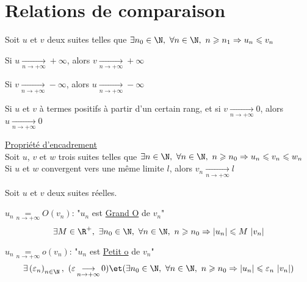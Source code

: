 \documentclass[12pt,twoside,a4paper]{article}
\begin{document}
	\section{Relations de comparaison}
		\begin{prop}
			Soit $u$ et $v$ deux suites telles que $\exists n_0\in\N,\ \forall n\in\N,\ n\geqslant n_1\Rightarrow u_n\leqslant v_n$
			\begin{liste}
				\item Si $u\mathop{\longrightarrow}\limits_{n\rightarrow+\infty}+\infty$, alors $v\mathop{\longrightarrow}\limits_{n\rightarrow+\infty}+\infty$
				\item Si $v\mathop{\longrightarrow}\limits_{n\rightarrow+\infty}-\infty$, alors $u\mathop{\longrightarrow}\limits_{n\rightarrow+\infty}-\infty$
				\item Si $u$ et $v$ \`a termes positifs \`a partir d'un certain rang, et si $v\mathop{\longrightarrow}\limits_{n\rightarrow+\infty}0$, alors $u\mathop{\longrightarrow}\limits_{n\rightarrow+\infty}0$
			\end{liste}
		\end{prop}
		\begin{prop}
			\underline{Propri\'et\'e d'encadrement}\\
			Soit $u$, $v$ et $w$ trois suites telles que $\exists n\in\N,\ \forall n\in\N,\ n\geqslant n_0\Rightarrow u_n\leqslant v_n\leqslant w_n$\\
			Si $u$ et $w$ convergent vers une m\^eme limite $l$, alors $v_n\mathop{\longrightarrow}\limits_{n\rightarrow+\infty}l$
		\end{prop}
		\begin{defi}
			Soit $u$ et $v$ deux suites r\'eelles.
			\begin{liste}
				\item $u_n\mathop{=}\limits_{n\rightarrow+\infty}O(v_n)$: "$u_n$ est \underline{Grand O} de $v_n$"\\
					$$\exists M\in\R^+,\ \exists n_0\in\N,\ \forall n\in\N,\ n\geqslant n_0\Rightarrow\left|u_n\right|\leqslant M\,\left|v_n\right|$$
				\item $u_n\mathop{=}\limits_{n\rightarrow+\infty}o(v_n)$: "$u_n$ est \underline{Petit o} de $v_n$"\\
					$$\exists \left(\varepsilon_n\right)_{n\in\N},\ (\varepsilon\mathop{\longrightarrow}\limits_{n\rightarrow+\infty}0)\et(\exists n_0\in\N,\ \forall n\in\N,\ n\geqslant n_0\Rightarrow\left|u_n\right|\leqslant \varepsilon_n\,\left|v_n\right|)$$
			\end{liste}
		\end{defi}
\end{document}
